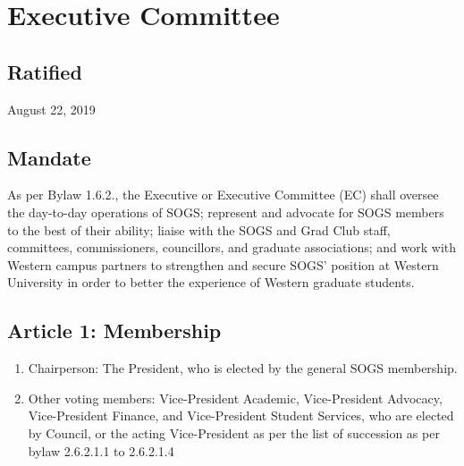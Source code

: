 \section{Executive Committee}

\subsection{Ratified}
August 22, 2019

\subsection{Mandate}
As per Bylaw 1.6.2., the Executive or Executive Committee (EC) shall oversee the day-to-day operations of SOGS; represent and advocate for SOGS members to the best of their ability; liaise with the SOGS and Grad Club staff, committees, commissioners, councillors, and graduate associations; and work with Western campus partners to strengthen and secure SOGS’ position at Western University in order to better the experience of Western graduate students.

\subsection{Article 1: Membership}
\begin{enumerate}[label*=\arabic*., align=left]
\item Chairperson: The President, who is elected by the general SOGS membership.
\item Other voting members: Vice-President Academic, Vice-President Advocacy, Vice-President Finance, and Vice-President Student Services, who are elected by Council, or the acting Vice-President as per the list of succession as per bylaw 2.6.2.1.1 to 2.6.2.1.4
\end{enumerate}

